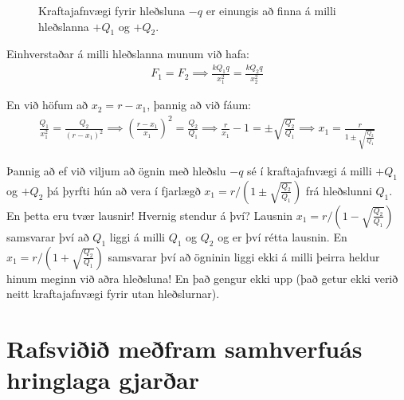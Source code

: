 \begin{figure}[H]
    \centering
{}
    \caption{Kraftajafnvægi fyrir hleðsluna $-q$ er einungis að finna á milli hleðslanna $+Q_1$ og $+Q_2$.}
\end{figure}

Einhverstaðar á milli hleðslanna munum við hafa:
\begin{align*}
    F_1 = F_2 \implies \frac{kQ_1 q}{x_1^2} = \frac{kQ_2 q}{x_2^2}
\end{align*}

En við höfum að $x_2 = r - x_1$, þannig að við fáum:
\begin{align*}
    \frac{Q_1}{x_1^2} = \frac{Q_2}{(r-x_1)^2} \implies \left( \frac{r-x_1}{x_1} \right)^2 = \frac{Q_2}{Q_1} \implies \frac{r}{x_1} - 1 = \pm \sqrt{\frac{Q_2}{Q_1}} \implies x_1 = \frac{r}{1 \pm \sqrt{\frac{Q_2}{Q_1}}}
\end{align*}

Þannig að ef við viljum að ögnin með hleðslu $-q$ sé í kraftajafnvægi á milli $+Q_1$ og $+Q_2$ þá þyrfti hún að vera í fjarlægð $x_1 = r/\left(1 \pm \sqrt{\frac{Q_2}{Q_1}}\right)$ frá hleðslunni $Q_1$. En þetta eru tvær lausnir! Hvernig stendur á því? Lausnin $x_1 = r/\left(1- \sqrt{\frac{Q_2}{Q_1}}\right)$ samsvarar því að $Q_1$ liggi á milli $Q_1$ og $Q_2$ og er því rétta lausnin. En $x_1 = r/\left(1 + \sqrt{\frac{Q_2}{Q_1}}\right)$ samsvarar því að ögninin liggi ekki á milli þeirra heldur hinum meginn við aðra hleðsluna! En það gengur ekki upp (það getur ekki verið neitt kraftajafnvægi fyrir utan hleðslurnar).



\section{Rafsviðið meðfram samhverfuás hringlaga gjarðar}


